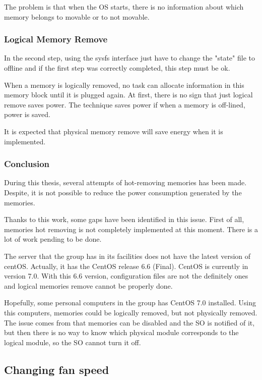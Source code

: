 The problem is that when the OS starts, there is no information about which memory belongs to movable or to not movable.

\subsubsection{Logical Memory Remove}

In the second step, using the sysfs interface just have to change the "state" file to offline and if the first step was correctly completed, this step must be ok.

When a memory is logically removed, no task can allocate information in this memory block until it is plugged again. At first, there is no sign that just logical remove saves power. The technique saves power if when a memory is off-lined, power is saved.

It is expected that physical memory remove will save energy when it is implemented.

\subsubsection{Conclusion}

During this thesis, several attempts of hot-removing memories has been made. Despite, it is not possible to reduce the power consumption generated by the memories.

Thanks to this work, some gaps have been identified in this issue. First of all, memories hot removing is not completely implemented at this moment. There is a lot of work pending to be done.

The server that the group has in its facilities does not have the latest version of centOS. Actually, it has the CentOS release 6.6 (Final). CentOS is currently in version 7.0. With this 6.6 version, configuration files are not the definitely ones and logical memories remove cannot be properly done.

Hopefully, some personal computers in the group has CentOS 7.0 installed. Using this computers, memories could be logically removed, but not physically removed. The issue comes from that memories can be disabled and the SO is notified of it, but then there is no way to know which physical module corresponds to the logical module, so the SO cannot turn it off.

\subsection{Changing fan speed}

